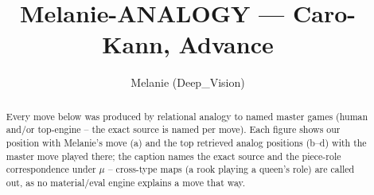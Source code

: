 \documentclass[11pt]{article}
\title{Melanie-ANALOGY — Caro-Kann, Advance}
\author{Melanie (Deep\_Vision)}
\date{}
\begin{document}
\maketitle

\begin{abstract}Every move below was produced by relational analogy to named master games (human and/or top-engine -- the exact source is named per move). Each figure shows our position with Melanie's move (a) and the top retrieved analog positions (b--d) with the master move played there; the caption names the exact source and the piece-role correspondence under $\mu$ -- cross-type maps (a rook playing a queen's role) are called out, as no material/eval engine explains a move that way.\end{abstract}

\begin{figure}[p]\centering
\begin{subfigure}{0.46\textwidth}\centering
\resizebox{\linewidth}{!}{%
\newchessgame
\chessboard[
  setfen={rn2kbnr/pp3ppp/1q2p3/2ppPb2/3P4/1P2BN2/P1P1BPPP/RN1QK2R b KQkq - 0 7},
  showmover=false,
  pgfstyle=straightmove, color=movearrow, markmove={f5-g6}
]}
\caption{}
\end{subfigure}\hfill
\begin{subfigure}{0.46\textwidth}\centering
\resizebox{\linewidth}{!}{%
\newchessgame
\chessboard[
  setfen={r1b1kbnr/pp3ppp/1qn1p3/2ppP3/3P4/P1P2N2/1P3PPP/RNBQKB1R b KQkq - 0 6},
  showmover=false,
  pgfstyle=straightmove, color=movearrow, markmove={g8-h6}
]}
\caption{}
\end{subfigure}
\\[4pt]
\begin{subfigure}{0.46\textwidth}\centering
\resizebox{\linewidth}{!}{%
\newchessgame
\chessboard[
  setfen={r1b1kbnr/pp3ppp/1qn1p3/2ppP3/3P4/P1P2N2/1P3PPP/RNBQKB1R b KQkq - 0 6},
  showmover=false,
  pgfstyle=straightmove, color=movearrow, markmove={g8-h6}
]}
\caption{}
\end{subfigure}\hfill
\begin{subfigure}{0.46\textwidth}\centering
\resizebox{\linewidth}{!}{%
\newchessgame
\chessboard[
  setfen={r1b1kbnr/pp3ppp/1qn1p3/2ppP3/3P4/P1P2N2/1P3PPP/RNBQKB1R b KQkq - 0 6},
  showmover=false,
  pgfstyle=straightmove, color=movearrow, markmove={g8-h6}
]}
\caption{}
\end{subfigure}

\end{figure}
\end{document}

